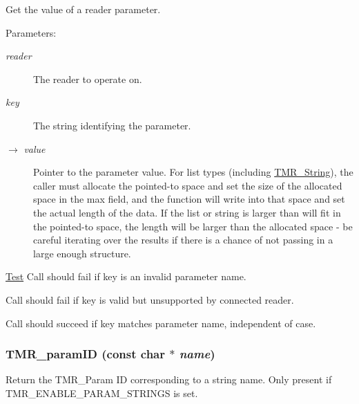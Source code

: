 Get the value of a reader parameter.

\begin{Desc}
\item[Parameters:]
\begin{description}
\item[{\em reader}]The reader to operate on. \item[{\em key}]The string identifying the parameter.\item[\mbox{$\rightarrow$} {\em value}]Pointer to the parameter value. For list types (including \hyperlink{struct_t_m_r___string}{TMR\_\-String}), the caller must allocate the pointed-to space and set the size of the allocated space in the max field, and the function will write into that space and set the actual length of the data. If the list or string is larger than will fit in the pointed-to space, the length will be larger than the allocated space - be careful iterating over the results if there is a chance of not passing in a large enough structure.\end{description}
\end{Desc}
\begin{Desc}
\item[\hyperlink{test__test000011}{Test}]Call should fail if key is an invalid parameter name. 

Call should fail if key is valid but unsupported by connected reader. 

Call should succeed if key matches parameter name, independent of case. \end{Desc}
\hypertarget{group__reader_g837ad11acb819d1427a2d9ecf1cef99a}{
\subsubsection[{TMR\_\-paramID}]{ TMR\_\-paramID (const char $\ast$ {\em name})}}
\label{group__reader_g837ad11acb819d1427a2d9ecf1cef99a}


Return the TMR\_\-Param ID corresponding to a string name. Only present if TMR\_\-ENABLE\_\-PARAM\_\-STRINGS is set.

